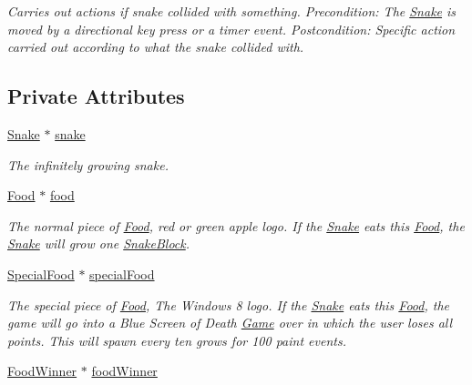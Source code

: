 \begin{DoxyCompactItemize}
\begin{DoxyCompactList}\small\item\em \-Carries out actions if snake collided with something. \-Precondition\-: \-The \hyperlink{classSnake}{\-Snake} is moved by a directional key press or a timer event. \-Postcondition\-: \-Specific action carried out according to what the snake collided with. \end{DoxyCompactList}\end{DoxyCompactItemize}
\subsection*{\-Private \-Attributes}
\begin{DoxyCompactItemize}
\item 
\hypertarget{classGame_ac6002315e7c8ba1da4fe7a763fe442b2}{\hyperlink{classSnake}{\-Snake} $\ast$ \hyperlink{classGame_ac6002315e7c8ba1da4fe7a763fe442b2}{snake}}\label{classGame_ac6002315e7c8ba1da4fe7a763fe442b2}

\begin{DoxyCompactList}\small\item\em \-The infinitely growing snake. \end{DoxyCompactList}\item 
\hypertarget{classGame_a9af4c00a595db1e8a377189fbfdfdbcd}{\hyperlink{classFood}{\-Food} $\ast$ \hyperlink{classGame_a9af4c00a595db1e8a377189fbfdfdbcd}{food}}\label{classGame_a9af4c00a595db1e8a377189fbfdfdbcd}

\begin{DoxyCompactList}\small\item\em \-The normal piece of \hyperlink{classFood}{\-Food}, red or green apple logo. \-If the \hyperlink{classSnake}{\-Snake} eats this \hyperlink{classFood}{\-Food}, the \hyperlink{classSnake}{\-Snake} will grow one \hyperlink{classSnakeBlock}{\-Snake\-Block}. \end{DoxyCompactList}\item 
\hypertarget{classGame_aad79a1e2a336f39acefdc46bd091110b}{\hyperlink{classSpecialFood}{\-Special\-Food} $\ast$ \hyperlink{classGame_aad79a1e2a336f39acefdc46bd091110b}{special\-Food}}\label{classGame_aad79a1e2a336f39acefdc46bd091110b}

\begin{DoxyCompactList}\small\item\em \-The special piece of \hyperlink{classFood}{\-Food}, \-The \-Windows 8 logo. \-If the \hyperlink{classSnake}{\-Snake} eats this \hyperlink{classFood}{\-Food}, the game will go into a \-Blue \-Screen of \-Death \hyperlink{classGame}{\-Game} over in which the user loses all points. \-This will spawn every ten grows for 100 paint events. \end{DoxyCompactList}\item 
\hypertarget{classGame_ad5fae274ed08a2f7e2e940f28c4dcafe}{\hyperlink{classFoodWinner}{\-Food\-Winner} $\ast$ \hyperlink{classGame_ad5fae274ed08a2f7e2e940f28c4dcafe}{food\-Winner}}\label{classGame_ad5fae274ed08a2f7e2e940f28c4dcafe}


\end{DoxyCompactItemize}
